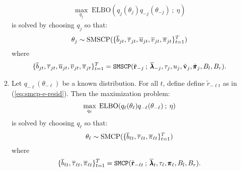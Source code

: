 \begin{proposition}
\begin{enumerate}[label=\roman*.]
\begin{align}
        \max_{q_j} \; \text{ELBO}(q_j(\theta_j)q_{-j}(\theta_{-j}) \:;\: \eta)\label{eq:elbo-j}
    \end{align}
    is solved by choosing $q_j$ so that: 
    \begin{align*}
        \normalfont
        \theta_j \sim \text{SMSCP}(\{\overline{b}_{jt}, \overline{\tau}_{jt}, \overline{u}_{jt}, \overline{v}_{jt}, \overline{\pi}_{jt}\}_{t=1}^T)
    \end{align*}
    where 
    \begin{align*}
        \normalfont
        \{\overline{b}_{jt}, \overline{\tau}_{jt}, \overline{u}_{jt}, \overline{v}_{jt}, \overline{\pi}_{jt}\}_{t=1}^T = \texttt{SMSCP}(\tilde{\mathbf{r}}_{-j} \:;\:\overline{\pmb{\lambda}}_{-j}, \tau_j, u_j, \tilde{\mathbf{v}}_j, \tilde{\pmb{\pi}}_j, B_l,B_r).
    \end{align*}

    \item Let $q_{-\ell}(\theta_{-\ell})$ be a known distribution. For all $t$, define define $\tilde{r}_{-\ell t}$ as in (\ref{eq:smcp-e-resid}). Then the maximization problem:
    \begin{align}
        \normalfont
        \max_{q_\ell} \; \text{ELBO}(q_\ell(\theta_\ell)q_{-\ell}(\theta_{-\ell}) \:;\: \eta) \label{eq:elbo-l}
    \end{align}
    is solved by choosing $q_\ell$ so that: 
    \begin{align*}
        \normalfont
        \theta_\ell \sim \text{SMCP}(\{\overline{b}_{\ell t}, \overline{\tau}_{\ell t}, \overline{\pi}_{\ell t}\}_{t=1}^T)
    \end{align*}
    where 
    \begin{align*}
        \normalfont
        \{\overline{b}_{\ell t}, \overline{\tau}_{\ell t}, \overline{\pi}_{\ell t}\}_{t=1}^T= \texttt{SMCP}(\tilde{\mathbf{r}}_{-\ell t} \:;\: \overline{\pmb{\lambda}}_t, \tau_{\ell}, \pmb{\pi}_{\ell}, B_l,B_r).
    \end{align*}


\end{enumerate}
\end{proposition}
